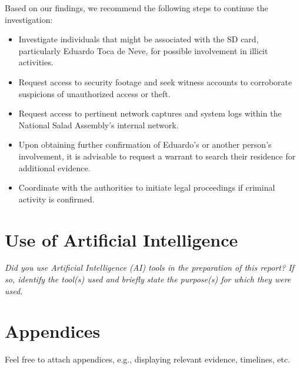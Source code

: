 \documentclass[11pt,a4paper,final,oneside]{article}
\begin{document}
Based on our findings, we recommend the following steps to continue the investigation:

\begin{itemize}[leftmargin=1.6em]
    \item Investigate individuals that might be associated with the SD card, particularly Eduardo Toca de Neve, for possible involvement in illicit activities.
    \item Request access to security footage and seek witness accounts to corroborate suspicions of unauthorized access or theft.
    \item Request access to pertinent network captures and system logs within the National Salad Assembly's internal network.
    \item Upon obtaining further confirmation of Eduardo's or another person's involvement, it is advisable to request a warrant to search their residence for additional evidence.
    \item Coordinate with the authorities to initiate legal proceedings if criminal activity is confirmed.
\end{itemize}

\section{Use of Artificial Intelligence}
\label{sec:ai}

\textit{Did you use Artificial Intelligence (AI) tools in the preparation
of this report? If so, identify the tool(s) used and briefly state the
purpose(s) for which they were used.}



\section{Appendices}
\label{sec:appendices}


Feel free to attach appendices, e.g., displaying relevant evidence, timelines, etc.
\end{document}
